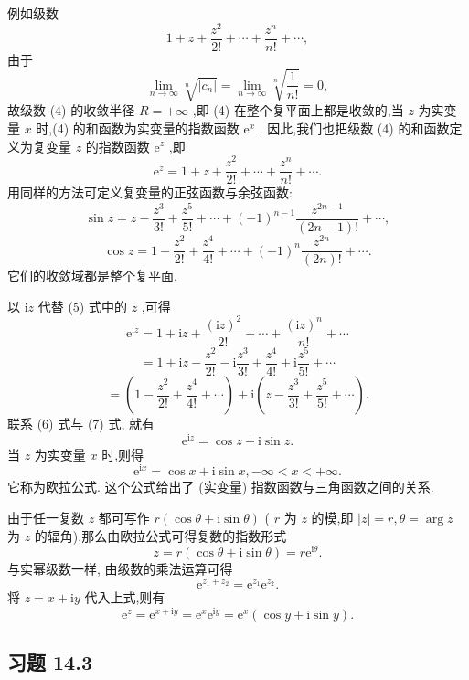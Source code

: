 例如级数
\[
1 + z + \frac{{z}^{2}}{2!} + \cdots  + \frac{{z}^{n}}{n!} + \cdots , \tag{4}
\]
由于
\[
\mathop{\lim }\limits_{{n \rightarrow  \infty }}\sqrt[n]{\left| {c}_{n}\right| } = \mathop{\lim }\limits_{{n \rightarrow  \infty }}\sqrt[n]{\frac{1}{n!}} = 0,
\]
故级数 (4) 的收敛半径 \(R =  + \infty\) ,即 (4) 在整个复平面上都是收敛的,当 \(z\) 为实变量 \(x\) 时,(4) 的和函数为实变量的指数函数 \({\mathrm{e}}^{x}\) . 因此,我们也把级数 (4) 的和函数定义为复变量 \(z\) 的指数函数 \({\mathrm{e}}^{z}\) ,即
\[
{\mathrm{e}}^{z} = 1 + z + \frac{{z}^{2}}{2!} + \cdots  + \frac{{z}^{n}}{n!} + \cdots . \tag{5}
\]
用同样的方法可定义复变量的正弦函数与余弦函数:
\[
\sin z = z - \frac{{z}^{3}}{3!} + \frac{{z}^{5}}{5!} + \cdots  + {\left( -1\right) }^{n - 1}\frac{{z}^{{2n} - 1}}{\left( {{2n} - 1}\right) !} + \cdots , \tag{6}
\]
\[
\cos z = 1 - \frac{{z}^{2}}{2!} + \frac{{z}^{4}}{4!} + \cdots  + {\left( -1\right) }^{n}\frac{{z}^{2n}}{\left( {2n}\right) !} + \cdots . \tag{7}
\]
它们的收敛域都是整个复平面.

以 \(\mathrm{i}z\) 代替 (5) 式中的 \(z\) ,可得
\[
{\mathrm{e}}^{\mathrm{i}z} = 1 + \mathrm{i}z + \frac{{\left( \mathrm{i}z\right) }^{2}}{2!} + \cdots  + \frac{{\left( \mathrm{i}z\right) }^{n}}{n!} + \cdots
\]
\[
= 1 + \mathrm{i}z - \frac{{z}^{2}}{2!} - \mathrm{i}\frac{{z}^{3}}{3!} + \frac{{z}^{4}}{4!} + \mathrm{i}\frac{{z}^{5}}{5!} + \cdots
\]
\[
= \left( {1 - \frac{{z}^{2}}{2!} + \frac{{z}^{4}}{4!} + \cdots }\right)  + \mathrm{i}\left( {z - \frac{{z}^{3}}{3!} + \frac{{z}^{5}}{5!} + \cdots }\right) .
\]
联系 (6) 式与 (7) 式, 就有
\[
{\mathrm{e}}^{\mathrm{i}z} = \cos z + \mathrm{i}\sin z.
\]
当 \(z\) 为实变量 \(x\) 时,则得
\[
{\mathrm{e}}^{\mathrm{i}x} = \cos x + \mathrm{i}\sin x, - \infty  < x <  + \infty .
\]
它称为欧拉公式. 这个公式给出了 (实变量) 指数函数与三角函数之间的关系.

由于任一复数 \(z\) 都可写作 \(r\left( {\cos \theta  + \mathrm{i}\sin \theta }\right)\) ( \(r\) 为 \(z\) 的模,即 \(\left| z\right|  = r,\theta  = \arg z\) 为 \(z\) 的辐角),那么由欧拉公式可得复数的指数形式
\[
z = r\left( {\cos \theta  + \mathrm{i}\sin \theta }\right)  = r{\mathrm{e}}^{\mathrm{i}\theta }.
\]
与实幂级数一样, 由级数的乘法运算可得
\[
{\mathrm{e}}^{{z}_{1} + {z}_{2}} = {\mathrm{e}}^{{z}_{1}}{\mathrm{e}}^{{z}_{2}}.
\]
将 \(z = x + \mathrm{i}y\) 代入上式,则有
\[
{\mathrm{e}}^{z} = {\mathrm{e}}^{x + \mathrm{i}y} = {\mathrm{e}}^{x}{\mathrm{e}}^{\mathrm{i}y} = {\mathrm{e}}^{x}\left( {\cos y + \mathrm{i}\sin y}\right) .
\]
\subsection{习题 14.3}

